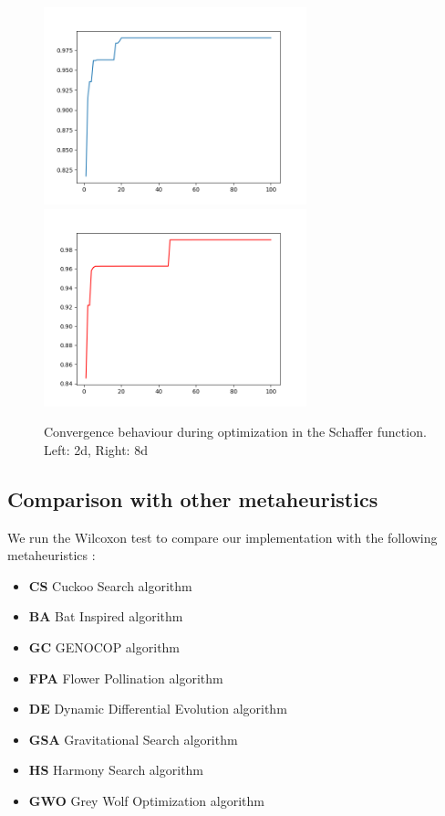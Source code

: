 \documentclass[journal,onecolumn]{IEEEtran}
\begin{document}
\begin{figure}[H]
\centering
\captionsetup{justification=centering}
\includegraphics[width=3.0in]{_img/img_PSO_convergence_schaffer6_2d.png}
\includegraphics[width=3.0in]{_img/img_PSO_convergence_schaffer6_8d.png}
\caption{Convergence behaviour during optimization in the Schaffer function. Left: 2d, Right: 8d}
\end{figure}

\subsection{ \textbf{Comparison with other metaheuristics} }

We run the Wilcoxon test to compare our implementation with the following metaheuristics :

\begin{itemize}

    \item \textbf{CS} Cuckoo Search algorithm
    \item \textbf{BA} Bat Inspired algorithm
    \item \textbf{GC} GENOCOP algorithm
    \item \textbf{FPA} Flower Pollination algorithm
    \item \textbf{DE} Dynamic Differential Evolution algorithm
    \item \textbf{GSA} Gravitational Search algorithm
    \item \textbf{HS} Harmony Search algorithm
    \item \textbf{GWO} Grey Wolf Optimization algorithm

\end{itemize}
\end{document}
